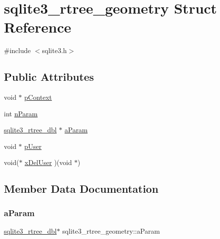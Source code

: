 \hypertarget{structsqlite3__rtree__geometry}{}\section{sqlite3\+\_\+rtree\+\_\+geometry Struct Reference}
\label{structsqlite3__rtree__geometry}


{\ttfamily \#include $<$sqlite3.\+h$>$}

\subsection*{Public Attributes}
\begin{DoxyCompactItemize}
\item 
void $\ast$ \mbox{\hyperlink{structsqlite3__rtree__geometry_a62fe439a49ed5b8628464c418f35f572}{p\+Context}}
\item 
int \mbox{\hyperlink{structsqlite3__rtree__geometry_ada7b9eba82660e3321dd4c93526697c9}{n\+Param}}
\item 
\mbox{\hyperlink{sqlite3_8h_ae9156ff58620c1ceae9391f1afabae1b}{sqlite3\+\_\+rtree\+\_\+dbl}} $\ast$ \mbox{\hyperlink{structsqlite3__rtree__geometry_a0a22e4b810cb1b8f1af792fd50493002}{a\+Param}}
\item 
void $\ast$ \mbox{\hyperlink{structsqlite3__rtree__geometry_add62e1cd5faa6000c815104af3c540d0}{p\+User}}
\item 
void($\ast$ \mbox{\hyperlink{structsqlite3__rtree__geometry_ae9835a39924a75b33cce9f6b10e1813f}{x\+Del\+User}} )(void $\ast$)
\end{DoxyCompactItemize}


\subsection{Member Data Documentation}
\mbox{\label{structsqlite3__rtree__geometry_a0a22e4b810cb1b8f1af792fd50493002}} 
\subsubsection{\texorpdfstring{aParam}{aParam}}
{\footnotesize\ttfamily \mbox{\hyperlink{sqlite3_8h_ae9156ff58620c1ceae9391f1afabae1b}{sqlite3\+\_\+rtree\+\_\+dbl}}$\ast$ sqlite3\+\_\+rtree\+\_\+geometry\+::a\+Param}

